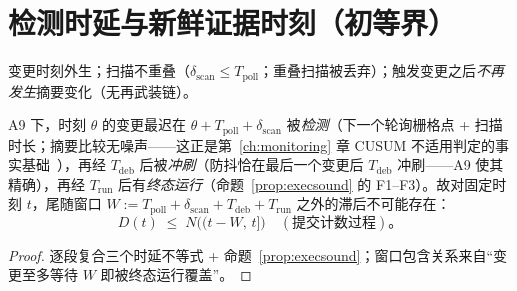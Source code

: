 \section{检测时延与新鲜证据时刻（初等界）}

\begin{assumptioninner}[{新鲜度界的确定性前提}]\label{ass:a9}
变更时刻外生；扫描不重叠（$\delta_{\mathrm{scan}}\le T_{\mathrm{poll}}$；重叠扫描被丢弃）；触发变更之后\emph{不再发生}摘要变化（无再武装链）。
\end{assumptioninner}

\begin{proposition}[新鲜证据时刻的上界]\label{prop:freshbound}
A9 下，时刻 $\theta$ 的变更最迟在 $\theta+T_{\mathrm{poll}}+\delta_{\mathrm{scan}}$ 被\emph{检测}（下一个轮询栅格点 + 扫描时长；摘要比较无噪声——这正是第~\ref{ch:monitoring} 章 CUSUM 不适用判定的事实基础~\cite{page1954}），再经 $T_{\mathrm{deb}}$ 后被\emph{冲刷}（防抖恰在最后一个变更后 $T_{\mathrm{deb}}$ 冲刷——A9 使其精确），再经 $T_{\mathrm{run}}$ 后有\emph{终态运行}（命题~\ref{prop:execsound} 的 F1--F3）。故对固定时刻 $t$，尾随窗口 $W:=T_{\mathrm{poll}}+\delta_{\mathrm{scan}}+T_{\mathrm{deb}}+T_{\mathrm{run}}$ 之外的滞后不可能存在：
\begin{equation}
D(t)\;\le\;N\bigl((t-W,\,t]\bigr)\quad(\text{提交计数过程})。
\end{equation}
\end{proposition}
\begin{proof}
逐段复合三个时延不等式 + 命题~\ref{prop:execsound}；窗口包含关系来自“变更至多等待 $W$ 即被终态运行覆盖”。
\end{proof}

